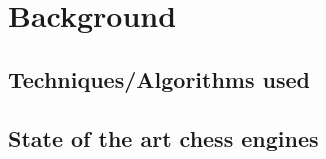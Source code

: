 \chapter{Background}
\label{chap:ch2}

\section{Techniques/Algorithms used}
\label{sec:ch2sec1}


\section{State of the art chess engines}
\label{sec:ch2sec2}

